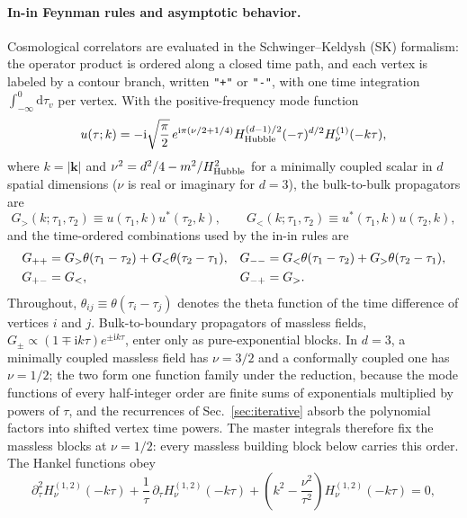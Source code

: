 \documentclass[11pt,a4paper]{article}
\numberwithin{table}{section}
\newcommand{\dd}{\mathrm d}
\newcommand{\ii}{\mathrm i}
\begin{document}
\paragraph{In-in Feynman rules and asymptotic behavior.}
Cosmological correlators are evaluated in the Schwinger--Keldysh (SK) formalism: the operator
product is ordered along a closed time path, and each vertex is labeled by a contour branch,
written \texttt{"+"} or \texttt{"-"}, with one time integration $\int_{-\infty}^0\dd\tau_v$ per
vertex. With the positive-frequency mode function
\begin{equation}
  u(\tau;k)=-\ii\sqrt{\frac{\pi}{2}}\,
  e^{\ii\pi(\nu/2+1/4)}H_{\rm Hubble}^{(d-1)/2}
  (-\tau)^{d/2}H^{(1)}_\nu(-k\tau),
  \label{eq:mode-function}
\end{equation}
where $k=|\bm k|$ and $\nu^2=d^2/4-m^2/H_{\rm Hubble}^2$ for a minimally coupled scalar in $d$
spatial dimensions ($\nu$ is real or imaginary for $d=3$), the bulk-to-bulk propagators are
\begin{equation}
  G_{>}(k;\tau_1,\tau_2)\equiv u(\tau_1,k)u^*(\tau_2,k),\qquad
  G_{<}(k;\tau_1,\tau_2)\equiv u^*(\tau_1,k)u(\tau_2,k),
  \label{eq:bulk-bulk-propagators}
\end{equation}
and the time-ordered combinations used by the in-in rules are
\begin{align}
  G_{++}&=G_{>}\theta(\tau_1-\tau_2)+G_{<}\theta(\tau_2-\tau_1),
  &G_{--}&=G_{<}\theta(\tau_1-\tau_2)+G_{>}\theta(\tau_2-\tau_1),
  \notag\\
  G_{+-}&=G_{<},
  &G_{-+}&=G_{>}.
  \label{eq:sk-propagators}
\end{align}
Throughout, $\theta_{ij}\equiv\theta(\tau_i-\tau_j)$ denotes the theta function of the time
difference of vertices $i$ and $j$. Bulk-to-boundary propagators of massless fields,
$G_\pm\propto(1\mp\ii k\tau)e^{\pm\ii k\tau}$, enter only as pure-exponential blocks.
In $d=3$, a minimally coupled massless field has $\nu=3/2$ and a conformally coupled one has
$\nu=1/2$; the two form one function family under the reduction, because the mode functions of
every half-integer order are finite sums of exponentials multiplied by powers of $\tau$, and the
recurrences of Sec.~\ref{sec:iterative} absorb the polynomial factors into shifted vertex time
powers. The master integrals therefore fix the massless blocks at $\nu=1/2$: every massless
building block below carries this order. The Hankel
functions obey
\begin{equation}
  \partial_\tau^2H^{(1,2)}_\nu(-k\tau)
  +\frac1\tau\,\partial_\tau H^{(1,2)}_\nu(-k\tau)
  +\left(k^2-\frac{\nu^2}{\tau^2}\right)H^{(1,2)}_\nu(-k\tau)=0,
  \label{eq:hankel-eom}
\end{equation}
\end{document}
